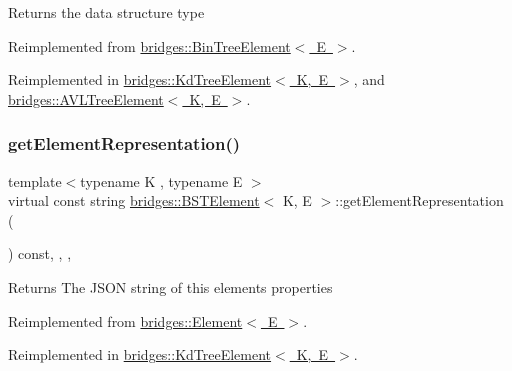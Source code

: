 \begin{DoxyReturn}{Returns}
the data structure type 
\end{DoxyReturn}


Reimplemented from \mbox{\hyperlink{classbridges_1_1_bin_tree_element_a0a154f68ef0a58715e598a6ef92b9e59}{bridges\+::\+Bin\+Tree\+Element$<$ E $>$}}.



Reimplemented in \mbox{\hyperlink{classbridges_1_1_kd_tree_element_acdd8f989986b7dd42cfacec73cf52dcb}{bridges\+::\+Kd\+Tree\+Element$<$ K, E $>$}}, and \mbox{\hyperlink{classbridges_1_1_a_v_l_tree_element_a24c005f8e07a7a2682225cead3b7e364}{bridges\+::\+A\+V\+L\+Tree\+Element$<$ K, E $>$}}.

\mbox{\label{classbridges_1_1_b_s_t_element_a623d1495a0d27090dc3fc515d148f381}} 
\subsubsection{\texorpdfstring{get\+Element\+Representation()}{getElementRepresentation()}}
{\footnotesize\ttfamily template$<$typename K , typename E $>$ \\
virtual const string \mbox{\hyperlink{classbridges_1_1_b_s_t_element}{bridges\+::\+B\+S\+T\+Element}}$<$ K, E $>$\+::get\+Element\+Representation (\begin{DoxyParamCaption}{ }\end{DoxyParamCaption}) const\hspace{0.3cm}{\ttfamily [inline]}, {\ttfamily [override]}, {\ttfamily [protected]}, {\ttfamily [virtual]}}

\begin{DoxyReturn}{Returns}
The J\+S\+ON string of this element\textquotesingle{}s properties 
\end{DoxyReturn}


Reimplemented from \mbox{\hyperlink{classbridges_1_1_element_abfea1b7226b774be648e15f6b2c9daba}{bridges\+::\+Element$<$ E $>$}}.



Reimplemented in \mbox{\hyperlink{classbridges_1_1_kd_tree_element_ad8aa2d89689f33691063fee9c601e2cb}{bridges\+::\+Kd\+Tree\+Element$<$ K, E $>$}}.

